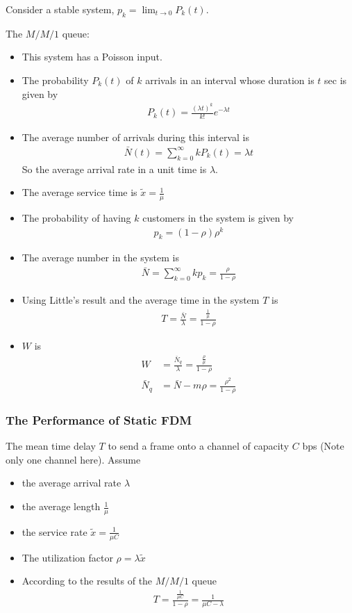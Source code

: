 Consider a stable system, $\displaystyle p_k=\lim_{t\to0} P_k(t)$. 

The $M/M/1$ queue: 
\begin{itemize}
    \item This system has a Poisson input. 
    \item The probability $P_k(t)$ of $k$ arrivals in an interval whose duration is $t$ sec is given by
    \begin{align*}
        P_k(t)=\frac{(\lambda t)^k}{k!}e^{-\lambda t}
    \end{align*}
    \item The average number of arrivals during this interval is
    \begin{align*}%
        \bar{N}(t)=\sum_{k=0}^{\infty} kP_k(t)=\lambda t
    \end{align*}
    So the average arrival rate in a unit time is $\lambda$.
    \item The average service time is $\tilde{x}=\frac{1}{\mu}$
    \item The probability of having $k$ customers in the system is given by
    \begin{align*}
        p_k=(1-\rho)\rho^k
    \end{align*}
    \item The average number in the system is
    \begin{align*}
        \bar{N}=\sum_{k=0}^\infty kp_k=\frac{\rho}{1-\rho}
    \end{align*}
    \item Using Little's result and the average time in the system $T$ is
    \begin{align*}
        T=\frac{\bar{N}}{\lambda}=\frac{\frac{1}{\mu}}{1-\rho}
    \end{align*}
    \item $W$ is
    \begin{align*}
        W&=\frac{\bar N_q}{\lambda}=\frac{\frac{\rho}{\mu}}{1-\rho}\\
        \bar N_q&=\bar N -m\rho =\frac{\rho^2}{1-\rho}
    \end{align*}
\end{itemize}

\subsubsection{The Performance of Static FDM}
The mean time delay $T$ to send a frame onto a channel of capacity $C$ bps (Note only one channel here). Assume
\begin{itemize}
    \item the average arrival rate $\lambda$
    \item the average length  $\frac{1}{\mu}$
    \item the service rate $\tilde{x}=\frac{1}{\mu C}$
    \item The utilization factor $\rho=\lambda\tilde{x}$
    \item According to the results of the $M/M/1$ queue
    \begin{align*}
        T=\frac{\frac{1}{\mu C}}{1-\rho}=\frac{1}{\mu C-\lambda}
    \end{align*}
\end{itemize}

